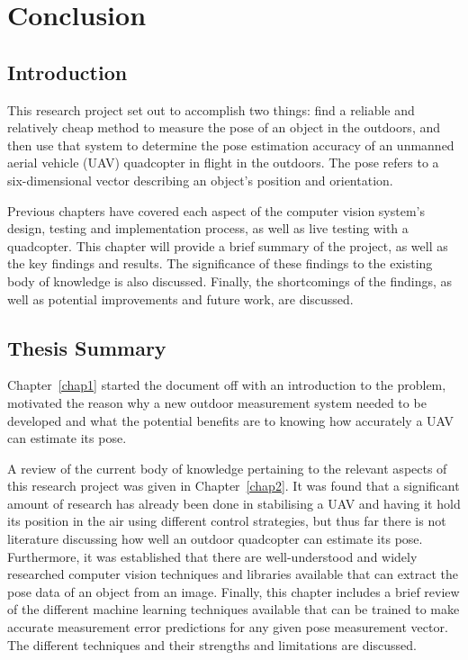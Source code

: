 \chapter{Conclusion}
\label{chap6}

\section{Introduction}

This research project set out to accomplish two things: find a reliable and relatively cheap method to measure the pose of an object in the outdoors, and then use that system to determine the pose estimation accuracy of an unmanned aerial vehicle (UAV) quadcopter in flight in the outdoors. The pose refers to a six-dimensional vector describing an object's position and orientation. 

Previous chapters have covered each aspect of the computer vision system's design, testing and implementation process, as well as live testing with a quadcopter. This chapter will provide a brief summary of the project, as well as the key findings and results. The significance of these findings to the existing body of knowledge is also discussed. Finally, the shortcomings of the findings, as well as potential improvements and future work, are discussed. 

\section{Thesis Summary}

Chapter~\ref{chap1} started the document off with an introduction to the problem, motivated the reason why a new outdoor measurement system needed to be developed and what the potential benefits are to knowing how accurately a UAV can estimate its pose.  

A review of the current body of knowledge pertaining to the relevant aspects of this research project was given in Chapter~\ref{chap2}. It was found that a significant amount of research has already been done in stabilising a UAV and having it hold its position in the air using different control strategies, but thus far there is not literature discussing how well an outdoor quadcopter can estimate its pose. Furthermore, it was established that there are well-understood and widely researched computer vision techniques and libraries available that can extract the pose data of an object from an image. Finally, this chapter includes a brief review of the different machine learning techniques available that can be trained to make accurate measurement error predictions for any given pose measurement vector. The different techniques and their strengths and limitations are discussed.  

